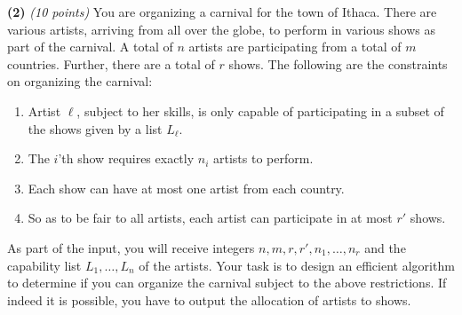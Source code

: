\documentclass[12pt]{article}
\def\bigap{0.25in}
\begin{document}
\setlength{\parindent}{0in}
\addtolength{\parskip}{0.1cm}
\setlength{\fboxrule}{.5mm}\setlength{\fboxsep}{1.2mm}
\newlength{\boxlength}\setlength{\boxlength}{\textwidth}
\addtolength{\boxlength}{-4mm}
\begin{center}
\end{center}
\vspace{5mm}
\vskip \bigap
{\bf (2)} {\em (10 points)} 
You are organizing a carnival for the town of Ithaca. There are various artists, arriving from all over the globe, to perform in various shows as part of the carnival. A total of $n$ artists are participating from a total of $m$ countries. Further, there are a total of $r$ shows.  The following are the constraints on organizing the carnival:

\begin{enumerate}
\item
Artist $\ell$, subject to her skills, is only capable of participating in a subset of the shows given by a list $L_{\ell}$.
\item
The $i$'th show requires exactly $n_i$ artists to perform.
\item
Each show can have at most one artist from each country.
\item
So as to be fair to all artists, each artist can participate in at most $r'$ shows.
\end{enumerate}
As part of the input, you will receive integers $n,m,r,r',n_1,\ldots,n_r$ and the capability list $L_{1},\ldots,L_n$ of the artists.
Your task is to design an efficient algorithm to determine if you can organize the carnival subject to the above restrictions. If indeed it is possible, you have to output the allocation of artists to shows.  
\vskip \bigap

\end{document}
